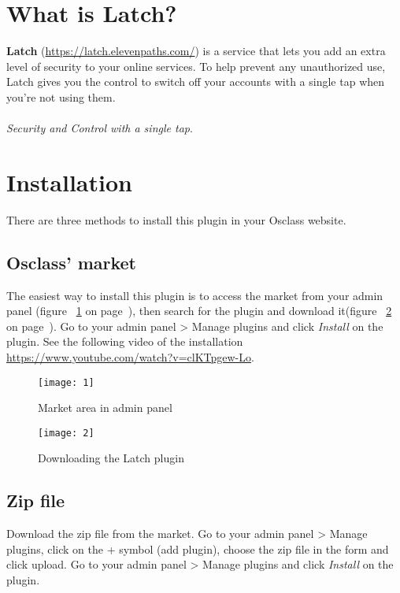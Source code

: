 \documentclass[
10pt,
a4paper,
oneside,
headinclude,footinclude,
BCOR5mm,
]{scrartcl}
\begin{document}
\section{What is Latch?}

\textbf{Latch} (\href{https://latch.elevenpaths.com/}{https://latch.elevenpaths.com/}) is a service that lets you add an extra level of security to your online services. To help prevent any unauthorized use, Latch gives you the control to switch off your accounts with a single tap when you’re not using them. \\
\\
\textit{Security and Control with a single tap}.




\section{Installation}
There are three methods to install this plugin in your Osclass website.

\subsection{Osclass' market}
The easiest way to install this plugin is to access the market from your admin panel (figure ~\ref{fig:market} on page~\pageref{fig:market}), then search for the plugin and download it(figure ~\ref{fig:download} on page~\pageref{fig:download}). Go to your admin panel > Manage plugins and click \textit{Install} on the plugin. See the following video of the installation \href{https://www.youtube.com/watch?v=clKTpgew-Lo}{https://www.youtube.com/watch?v=clKTpgew-Lo}.



\begin{figure}[h!]
  \begin{center}
    \texttt{[image: 1]}
    \caption{Market area in admin panel}
    \label{fig:market}
  \end{center}
\end{figure}



\begin{figure}[h!]
  \begin{center}
    \texttt{[image: 2]}
    \caption{Downloading the Latch plugin}
    \label{fig:download}
  \end{center}
\end{figure}


\subsection{Zip file}
Download the zip file from the market. Go to your admin panel >  Manage plugins, click on the + symbol (add plugin), choose the zip file in the form and click upload. Go to your admin panel > Manage plugins and click \textit{Install} on the plugin.
\end{document}
